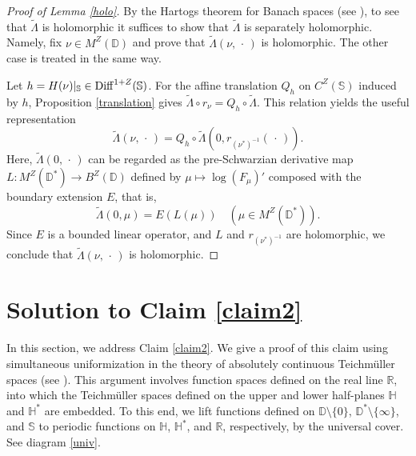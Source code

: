\documentclass[amstex]{amsart}
\theoremstyle{definition}
\theoremstyle{remark}
\numberwithin{equation}{section}
\begin{document}
\begin{proof}[Proof of Lemma \ref{holo}]
By the Hartogs theorem for Banach spaces (see \cite[\S 14.27]{Ch}), to see that $\widetilde \Lambda$ is holomorphic
it suffices to show that $\widetilde \Lambda$ is separately holomorphic.
Namely, fix $\nu \in M^Z(\mathbb D)$ and prove that $\widetilde \Lambda(\nu,\,\cdot \,)$ is holomorphic. 
The other case is treated in the same way.

Let $h=H(\nu)|_{\mathbb S} \in {\rm Diff}^{1+Z}(\mathbb S)$.
For the affine translation $Q_{h}$ on $C^Z(\mathbb S)$ induced by $h$,
Proposition \ref{translation} gives 
$\widetilde \Lambda \circ r_{\nu} = Q_{h} \circ \widetilde \Lambda$.
This relation yields
the useful representation
\begin{equation}
\widetilde \Lambda(\nu,\,\cdot \,)=Q_{h} \circ \widetilde \Lambda\!\left(0,r_{(\nu^*)^{-1}}(\,\cdot \,)\right).
\end{equation}
Here, 
$\widetilde \Lambda(0,\,\cdot \,)$ can be regarded as 
the pre-Schwarzian derivative map $L:M^Z(\mathbb D^*) \to B^Z(\mathbb D)$ defined by $\mu \mapsto \log (F_\mu)'$
composed with the boundary extension $E$, that is,
\begin{equation}\label{pre-Schwarz}
\widetilde \Lambda(0,\mu)=E(L(\mu)) \quad (\mu \in M^Z(\mathbb D^*)).
\end{equation}
Since $E$ is a bounded linear operator, and $L$ and $r_{(\nu^*)^{-1}}$ are holomorphic, we conclude that
$\widetilde \Lambda(\nu,\,\cdot \,)$ is holomorphic.
\end{proof}



\section{Solution to Claim \ref{claim2}}\label{5}

In this section, we address Claim \ref{claim2}.
We give a proof of this claim 
using simultaneous uniformization in the theory of absolutely continuous Teichm\"uller spaces (see \cite{M5}).
This argument involves function spaces defined on the real line $\mathbb R$, into which the Teichm\"uller spaces defined on
the upper and lower half-planes $\mathbb H$ and $\mathbb H^*$ are embedded.
To this end, 
we lift functions defined on $\mathbb D \setminus \{0\}$, $\mathbb D^* \setminus \{\infty\}$, and $\mathbb S$ to 
periodic functions on $\mathbb H$, $\mathbb H^*$, and $\mathbb R$, respectively, by the universal cover. See diagram \eqref{univ}.
\end{document}
